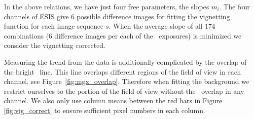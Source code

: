 In the above relations, we have just four free parameters, the slopes $m_i$. 
The four channels of ESIS give 6 possible difference images for fitting the vignetting function for each image sequence $s$. 
When the average slope of all 174 combinations (6 difference images per each of the \numDataFrames \ exposures) is minimized we consider the vignetting corrected.

Measuring the trend from the data is additionally complicated by the overlap of the bright \mgxbright \ line.  
This line overlaps different regions of the field of view in each channel, see Figure~\ref{fig:mgx_overlap}.  
Therefore when fitting the background we restrict ourselves to the portion of the field of view without the \mgxbright \ overlap in any channel.
We also only use column means between the red bars in Figure \ref{fig:vig_correct} to ensure sufficient pixel numbers in each column.  

